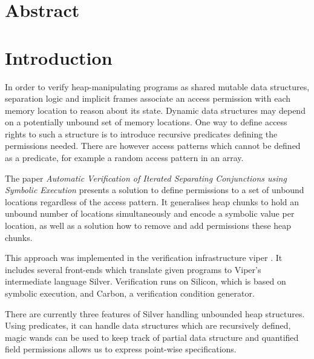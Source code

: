 \documentclass[12pt]{article}
\begin{document}
\clearpage
\newcommand*{\ident}{\hspace*{0.5cm}}

\maketitle
\newpage

\clearpage
{}
\tableofcontents
\newpage
\clearpage
{}%
\section{Abstract}
\section{Introduction}
In order to verify heap-manipulating programs as shared mutable data structures, separation logic\cite{reynolds2002separation} and implicit frames\cite{smans2009implicit} associate an access permission with each memory location to reason about its state. 
Dynamic data structures may depend on a potentially unbound set of memory locations. One way to define access rights to such a structure is to introduce recursive predicates defining the permissions needed. There are however access patterns which cannot be defined as a predicate, for example a random access pattern in an array.

The paper \textit{Automatic Verification of Iterated Separating Conjunctions using Symbolic Execution}\cite{isc} presents a solution to define permissions to a set of unbound locations regardless of the access pattern. It generalises heap chunks to hold an unbound number of locations simultaneously and encode a symbolic value per location, as well as a solution how to remove and add permissions these heap chunks.

This approach was implemented in the verification infrastructure viper \cite{viper}. It includes several front-ends which translate given programs to Viper's intermediate language Silver. Verification runs on Silicon, which is based on symbolic execution, and Carbon, a verification condition generator.

There are currently three features of Silver handling unbounded heap structures. Using predicates, it can handle data structures which are recursively defined, magic wands \cite{magicwand} can be used to keep track of partial data structure and quantified field permissions \cite{isc} allows us to express point-wise specifications. 
\end{document}
